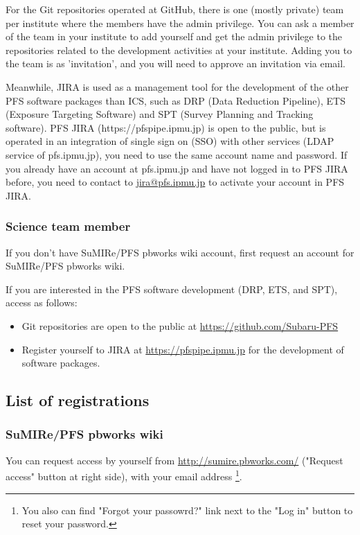\documentclass[a4paper,notitlepage]{article}
\begin{document}
For the Git repositories operated at GitHub, 
there is one (mostly private) team per institute where the members have 
the admin privilege. 
You can ask a member of the team in your institute to add yourself and 
get the admin privilege to the repositories related to the development 
activities at your institute. Adding you to the team is as 'invitation', 
and you will need to approve an invitation via email. 

Meanwhile, JIRA is used as a management tool for the development of 
the other PFS software packages than ICS, such as DRP (Data Reduction 
Pipeline), ETS (Exposure Targeting Software) and SPT (Survey Planning 
and Tracking software). PFS JIRA (https://pfspipe.ipmu.jp) is open to 
the public, but is operated in an integration of single sign on (SSO) with 
other services (LDAP service of pfs.ipmu.jp), you need to use the same 
account name and password. If you already have an account at pfs.ipmu.jp 
and have not logged in to PFS JIRA before, you need to contact to 
\url{jira@pfs.ipmu.jp} to activate your account in PFS JIRA.


\subsubsection{Science team member}

If you don't have SuMIRe/PFS pbworks wiki account, first request an account 
for SuMIRe/PFS pbworks wiki. 

If you are interested in the PFS software development (DRP, ETS, and SPT), 
access as follows: 
\begin{itemize}
  \item Git repositories are open to the public at \url{https://github.com/Subaru-PFS}
  \item Register yourself to JIRA at \url{https://pfspipe.ipmu.jp} for the development of software packages.
\end{itemize}

\subsection{List of registrations}

\subsubsection{SuMIRe/PFS pbworks wiki}

You can request access by yourself from \url{http://sumire.pbworks.com/} 
("Request access" button at right side), with your email address
\footnote{You also can find "Forgot your passowrd?" link next to the "Log in" 
button to reset your password.}.
\end{document}
